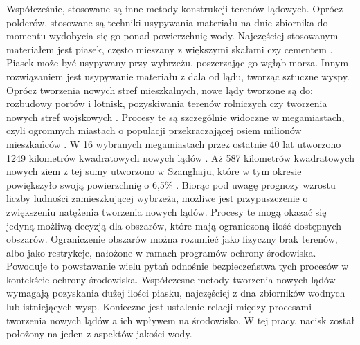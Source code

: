 \documentclass{amuthesis}
\begin{document}
Współcześnie, stosowane są inne metody konstrukcji terenów lądowych.
Oprócz polderów, stosowane są techniki usypywania materiału na dnie
zbiornika do momentu wydobycia się go ponad powierzchnię wody.
Najczęściej stosowanym materiałem jest piasek, często mieszany z
większymi skałami czy cementem \autocite{martin2016review}. Piasek może
być usypywany przy wybrzeżu, poszerzając go wgłąb morza. Innym
rozwiązaniem jest usypywanie materiału z dala od lądu, tworząc sztuczne
wyspy. Oprócz tworzenia nowych stref mieszkalnych, nowe lądy tworzone są
do: rozbudowy portów i lotnisk, pozyskiwania terenów rolniczych czy
tworzenia nowych stref wojskowych \autocite{martin2016review}. Procesy
te są szczególnie widoczne w megamiastach, czyli ogromnych miastach o
populacji przekraczającej osiem milionów mieszkańców
\autocite{wenzel2007megacities}. W 16 wybranych megamiastach przez
ostatnie 40 lat utworzono 1249 kilometrów kwadratowych nowych lądów
\autocite{sengupta2018building}. Aż 587 kilometrów kwadratowych nowych
ziem z tej sumy utworzono w Szanghaju, które w tym okresie powiększyło
swoją powierzchnię o 6,5\% \autocite{sengupta2018building}. Biorąc pod
uwagę prognozy wzrostu liczby ludności zamieszkującej wybrzeża, możliwe
jest przypuszczenie o zwiększeniu natężenia tworzenia nowych lądów.
Procesy te mogą okazać się jedyną możliwą decyzją dla obszarów, które
mają ograniczoną ilość dostępnych obszarów. Ograniczenie obszarów można
rozumieć jako fizyczny brak terenów, albo jako restrykcje, nałożone w
ramach programów ochrony środowiska. Powoduje to powstawanie wielu pytań
odnośnie bezpieczeństwa tych procesów w kontekście ochrony środowiska.
Współczesne metody tworzenia nowych lądów wymagają pozyskania dużej
ilości piasku, najczęściej z dna zbiorników wodnych lub istniejących
wysp. Konieczne jest ustalenie relacji między procesami tworzenia nowych
lądów a ich wpływem na środowisko. W tej pracy, nacisk został położony
na jeden z aspektów jakości wody.
\end{document}
